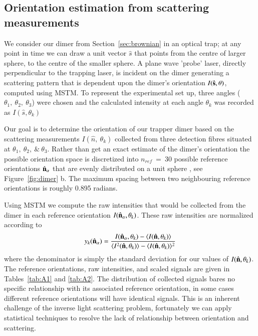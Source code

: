 \documentclass[final,  3p]{elsarticle}
\begin{document}
\subsection{Orientation estimation from scattering measurements}
\label{sec:Bayes}

We consider our dimer from Section~\ref{sec:brownian} in an optical trap; at any point in time we can draw a unit vector $\hat{s}$ that points from the centre of larger sphere, to the centre of the smaller sphere. A plane wave 'probe' laser, directly perpendicular to the trapping laser, is incident on the dimer generating a scattering pattern that is dependent upon the dimer's orientation $I(\hat{\bf s}, \theta)$, computed using MSTM. To represent the experimental set up, three angles  ($\theta_1, \ \theta_2, \ \theta_3$) were chosen and the calculated intensity at each angle $\theta_k$ was recorded as $I(\hat{s}, \theta_k)$

Our goal is to determine the orientation of our trapper dimer based on the scattering measurements $I(\hat{n}, \ \theta_k)$ collected from three detection fibres situated at $\theta_1,\ \theta_2, \ \& \ \theta_3$. Rather than get an exact estimate of the dimer's orientation the possible orientation space is discretized into $\textit{n}_{ref} \ = \ 30$ possible reference orientations $\hat{\bf n}_{\alpha}$ that are evenly distributed on a unit sphere \cite{Rey2006}, see Figure~\ref{fig:dimer} b. The maximum spacing between two neighbouring reference orientations is roughly 0.895 radians. 

Using MSTM we compute the raw intensities that would be collected from the dimer in each reference orientation $I(\hat{\bf n}_{\alpha}, \theta_k)$. 
%
These raw intensities are normalized according to
\begin{align}
\label{eq:scale}
  y_k(\hat{\bf n}_\alpha)
  = 
  \frac{I(\hat{\bf n}_\alpha, \theta_k) - \langle I(\hat{\bf n},\theta_k) \rangle } 
  {\langle I^2(\hat{\bf n},\theta_k) \rangle -\langle I(\hat{\bf n}, \theta_k)\rangle^2}
\end{align}
where the denominator is simply the standard deviation for our values of $I(\hat{\bf n}, \theta_k)$. The reference orientations, raw intensities, and scaled signals are given in Tables~\ref{tab:A1} and \ref{tab:A2}. The distribution of collected signals bares no specific relationship with its associated reference orientation, in some cases different reference orientations will have identical signals. This is an inherent challenge of the inverse light scattering problem, fortunately we can apply statistical techniques to resolve the lack of relationship between orientation and scattering.
\end{document}
